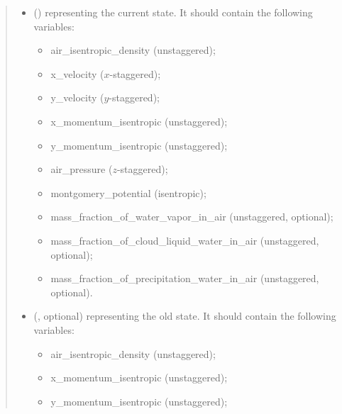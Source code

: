 \documentclass[letterpaper,10pt,english]{sphinxmanual}
\begin{document}
\begin{fulllineitems}
\begin{fulllineitems}
\begin{quote}
\begin{description}
\begin{itemize}
\item {} 
 () \textendash{} 
{\hyperref[\detokenize{api:storages.state_isentropic.StateIsentropic}]{}} representing the current state.
It should contain the following variables:
\begin{itemize}
\item {} 
air\_isentropic\_density (unstaggered);

\item {} 
x\_velocity (\(x\)-staggered);

\item {} 
y\_velocity (\(y\)-staggered);

\item {} 
x\_momentum\_isentropic (unstaggered);

\item {} 
y\_momentum\_isentropic (unstaggered);

\item {} 
air\_pressure (\(z\)-staggered);

\item {} 
montgomery\_potential (isentropic);

\item {} 
mass\_fraction\_of\_water\_vapor\_in\_air (unstaggered, optional);

\item {} 
mass\_fraction\_of\_cloud\_liquid\_water\_in\_air (unstaggered, optional);

\item {} 
mass\_fraction\_of\_precipitation\_water\_in\_air (unstaggered, optional).

\end{itemize}


\item {} 
 (, optional) \textendash{} 
{\hyperref[\detokenize{api:storages.state_isentropic.StateIsentropic}]{}} representing the old state.
It should contain the following variables:
\begin{itemize}
\item {} 
air\_isentropic\_density (unstaggered);

\item {} 
x\_momentum\_isentropic (unstaggered);

\item {} 
y\_momentum\_isentropic (unstaggered);


\end{itemize}
\end{itemize}
\end{description}
\end{quote}
\end{fulllineitems}
\end{fulllineitems}
\end{document}
